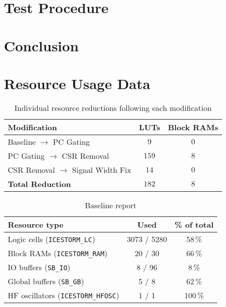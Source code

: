\documentclass[a4paper,10pt]{article}
\begin{document}
\section{Test Procedure}
\label{sec:Test_Procedure}

\section{Conclusion}
\label{sec:Conclusion}

\newpage
\appendix
\section{Resource Usage Data}

\begin{table}[H] 
    \centering
    \begin{tabularx}{0.6\textwidth}{X c c}
        \toprule
        Modification & LUTs & Block RAMs \\ \midrule
        Baseline $\rightarrow$ PC Gating & $9$ & $0$ \\
        PC Gating $\rightarrow$ CSR Removal & $159$ & $8$ \\
        CSR Removal $\rightarrow$ Signal Width Fix & $14$ & $0$ \\ \midrule
        \textbf{Total Reduction} & \textbf{$182$} & \textbf{$8$} \\
        \bottomrule
    \end{tabularx}
    \caption{Individual resource reductions following each modification}
    \label{tab:modification_reductions}
\end{table}


\begin{table}[H] 
    \centering
    \begin{tabularx}{0.65\textwidth}{X c c}
        \toprule
        Resource type & Used & \% of total \\ \midrule
        Logic cells (\texttt{ICESTORM\_LC}) & 3073 / 5280 & 58\,\% \\
        Block RAMs (\texttt{ICESTORM\_RAM}) & 20 / 30 & 66\,\% \\
        IO buffers (\texttt{SB\_IO}) & 8 / 96 & 8\,\% \\
        Global buffers (\texttt{SB\_GB}) & 5 / 8 & 62\,\% \\
        HF oscillators (\texttt{ICESTORM\_HFOSC}) & 1 / 1 & 100\,\% \\
        \bottomrule
    \end{tabularx}
    \caption{Baseline report}
    \label{tab:baseline}
\end{table}
\end{document}
